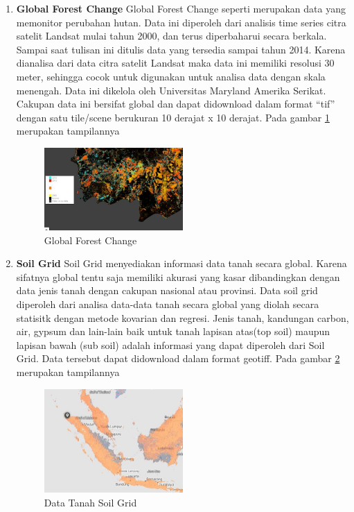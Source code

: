 \begin{enumerate}
\item \textbf{Global Forest Change}
\subitem Global Forest Change seperti merupakan data yang memonitor perubahan hutan. Data ini diperoleh dari analisis time series citra satelit Landsat mulai tahun 2000, dan terus diperbaharui secara berkala.  Sampai saat tulisan ini ditulis data yang tersedia sampai tahun 2014. Karena dianalisa dari data citra satelit Landsat maka data ini memiliki resolusi 30 meter, sehingga cocok untuk digunakan untuk analisa data dengan skala menengah. Data ini dikelola oleh Universitas Maryland Amerika Serikat. Cakupan data ini bersifat global dan dapat didownload dalam format “tif” dengan satu tile/scene berukuran 10 derajat x 10 derajat. Pada gambar \ref{labelgambar4} merupakan tampilannya
\begin{figure}[ht]
\centering
\includegraphics[width=0.5\textwidth]{pictures/Global_Forest_Change}
\caption{Global Forest Change}
\label{labelgambar4}
\end{figure}

\item \textbf{Soil Grid}
\subitem Soil Grid menyediakan informasi data tanah secara global. Karena sifatnya global tentu saja memiliki akurasi yang kasar dibandingkan dengan data jenis tanah dengan cakupan nasional atau provinsi. Data soil grid diperoleh dari analisa data-data tanah secara global yang diolah secara statisitk dengan metode kovarian dan regresi. Jenis tanah, kandungan carbon, air, gypsum dan lain-lain baik untuk tanah lapisan atas(top soil) maupun lapisan bawah (sub soil) adalah informasi yang dapat diperoleh dari Soil Grid. Data tersebut dapat didownload dalam format geotiff.  Pada gambar \ref{labelgambar5} merupakan tampilannya  

\begin{figure}[ht]
\centering
\includegraphics[width=0.5\textwidth]{pictures/Data_Tanah_Soil_Grid}
\caption{Data Tanah Soil Grid}
\label{labelgambar5}
\end{figure}


\end{enumerate}
